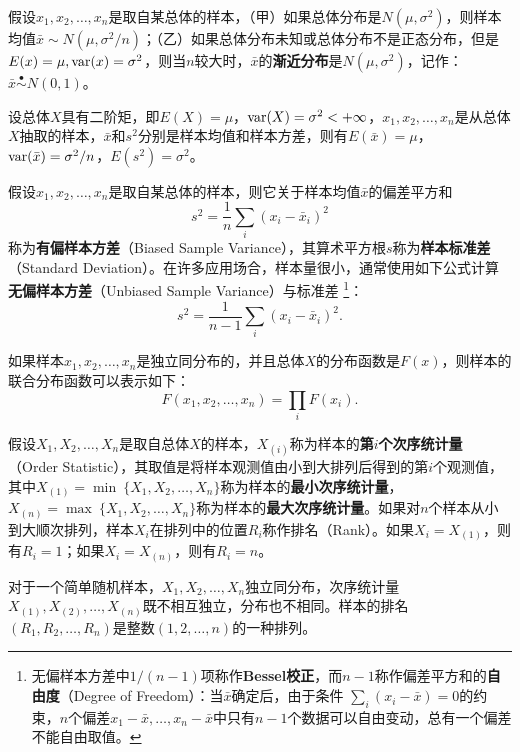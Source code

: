\begin{theorem}
假设$x_1,x_2,\ldots,x_n$是取自某总体的样本，（甲）如果总体分布是$N(\mu,\sigma^2)$，则样本均值$\bar x\sim N(\mu,\sigma^2/n)$；（乙）如果总体分布未知或总体分布不是正态分布，但是$E(x)=\mu,\operatorname{\mathrm{var}}(x) = \sigma^2$，则当$n$较大时，$\bar x$的\textbf{渐近分布}是$N(\mu,\sigma^2)$，记作：$\bar x \stackrel{\bullet}{\sim} N(0,1)$。
\end{theorem}

\begin{theorem}
设总体$X$具有二阶矩，即$E(X)=\mu$，$\operatorname{\mathrm{var}}(X)=\sigma^2 < +\infty$，$x_1,x_2,\ldots,x_n$是从总体$X$抽取的样本，$\bar x$和$s^2$分别是样本均值和样本方差，则有$E(\bar x)=\mu$，$\operatorname{\mathrm{var}}(\bar x)=\sigma^2/n$，$E(s^2)=\sigma^2$。
\end{theorem}

\begin{definition}[样本方差和标准差]
假设$x_1,x_2,\ldots,x_n$是取自某总体的样本，则它关于样本均值$\bar x$的偏差平方和
\begin{equation}
    s^2 = \frac{1}{n}\sum\limits_i (x_i - \bar{x}_i)^2
\end{equation}
称为\textbf{有偏样本方差}（Biased Sample Variance），其算术平方根$s$称为\textbf{样本标准差}（Standard Deviation）。在许多应用场合，样本量很小，通常使用如下公式计算\textbf{无偏样本方差}（Unbiased Sample Variance）与标准差
\footnote{无偏样本方差中$1/(n-1)$项称作\textbf{Bessel校正}，而$n-1$称作偏差平方和的\textbf{自由度}（Degree of Freedom）：当$\bar{x}$确定后，由于条件
$\sum\limits_i (x_i - \bar{x}) = 0$的约束，$n$个偏差$x_1-\bar{x},\ldots,x_n-\bar{x}$中只有$n-1$个数据可以自由变动，总有一个偏差不能自由取值。}：
\begin{equation}
    s^2 = \frac{1}{n-1}\sum\limits_i (x_i - \bar x_i)^2.
\end{equation}
\end{definition}
如果样本$x_1, x_2, \ldots, x_n$是独立同分布的，并且总体$X$的分布函数是$F(x)$，则样本的联合分布函数可以表示如下：
\[
    F(x_1,x_2,\ldots, x_n) = \prod\limits_i F(x_i).
\]

\begin{definition}[次序统计量]
假设$X_1,X_2,\ldots,X_n$是取自总体$X$的样本，$X_{(i)}$称为样本的\textbf{第$i$个次序统计量}（Order Statistic），其取值是将样本观测值由小到大排列后得到的第$i$个观测值，其中$X_{(1)}=\min~\{X_1,X_2,\ldots,X_n\}$称为样本的\textbf{最小次序统计量}，$X_{(n)}=\max~\{X_1,X_2,\ldots,X_n\}$称为样本的\textbf{最大次序统计量}。如果对$n$个样本从小到大顺次排列，样本$X_i$在排列中的位置$R_i$称作排名（Rank）。如果$X_i=X_{(1)}$，则有$R_i=1$；如果$X_i=X_{(n)}$，则有$R_i=n$。
\end{definition}
对于一个简单随机样本，$X_1,X_2,\ldots,X_n$独立同分布，次序统计量$X_{(1)},X_{(2)},\ldots,X_{(n)}$既不相互独立，分布也不相同。样本的排名$(R_1, R_2, \ldots, R_n)$是整数$(1,2,\ldots,n)$的一种排列。

